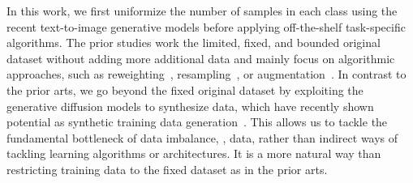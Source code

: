 In this work, we first uniformize the number of samples in each class using the recent text-to-image generative models before applying off-the-shelf task-specific algorithms.
The prior studies 
work the limited, fixed, and bounded original dataset without adding more additional data and mainly focus on algorithmic approaches, such as reweighting~\cite{cao2019learning,ren2020balanced,samuel2021distributional,huang2019deep, ben2009robust, sagawa2019distributionally, jung2023reweighting}, resampling~\cite{shen2016relay,park2022majority,kim2020m2m,liu2019large, kamiran2012data, idrissi2022simple, roh2020fairbatch}, or augmentation~\cite{chuang2021fair, kim2020m2m, park2022majority}.
In contrast to the prior arts, we go beyond the fixed original dataset by exploiting
the generative diffusion models to synthesize data, which have recently shown potential as synthetic training data generation~\cite{poole2023dreamfusion, raj2023dreambooth3d, chen2023fantasia3d,trabucco2023effective, he2022synthetic, azizi2023synthetic}.
This allows us to tackle the fundamental bottleneck of data imbalance, \ie, data, rather than indirect ways of tackling learning algorithms or architectures.
It is a more natural way than restricting training data to the fixed dataset as in the prior arts.

